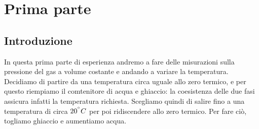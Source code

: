\section{Prima parte}
\subsection{Introduzione}
In questa prima parte di esperienza andremo a fare delle misurazioni sulla pressione del gas a volume costante e andando a variare la temperatura.
Decidiamo di partire da una temperatura circa uguale allo zero termico, e per questo riempiamo il comtenitore di acqua e ghiaccio: la coesistenza delle due fasi assicura infatti la temperatura richiesta.
Scegliamo quindi di salire fino a una temperatura di circa $20^{\degree} C$ per poi ridiscendere allo zero termico.
Per fare ciò, togliamo ghiaccio e aumentiamo acqua.
